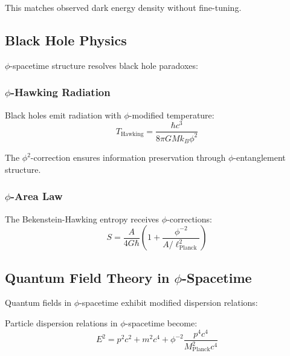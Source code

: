 This matches observed dark energy density without fine-tuning.

\subsection{Black Hole Physics}

$\phi$-spacetime structure resolves black hole paradoxes:

\subsubsection{$\phi$-Hawking Radiation}

\begin{theorem}
Black holes emit radiation with $\phi$-modified temperature:
\begin{equation}
T_{\text{Hawking}} = \frac{\hbar c^3}{8\pi G M k_B \phi^2}
\label{eq:phi_hawking_temperature}
\end{equation}
\end{theorem}

The $\phi^2$-correction ensures information preservation through $\phi$-entanglement structure.

\subsubsection{$\phi$-Area Law}

The Bekenstein-Hawking entropy receives $\phi$-corrections:
\begin{equation}
S = \frac{A}{4G\hbar} \left(1 + \frac{\phi^{-2}}{A/\ell_{\text{Planck}}^2}\right)
\end{equation}

\subsection{Quantum Field Theory in $\phi$-Spacetime}

Quantum fields in $\phi$-spacetime exhibit modified dispersion relations:

\begin{theorem}
Particle dispersion relations in $\phi$-spacetime become:
\begin{equation}
E^2 = p^2 c^2 + m^2 c^4 + \phi^{-2} \frac{p^4 c^4}{M_{\text{Planck}}^2 c^4}
\label{eq:phi_dispersion_relations}
\end{equation}
\end{theorem}

